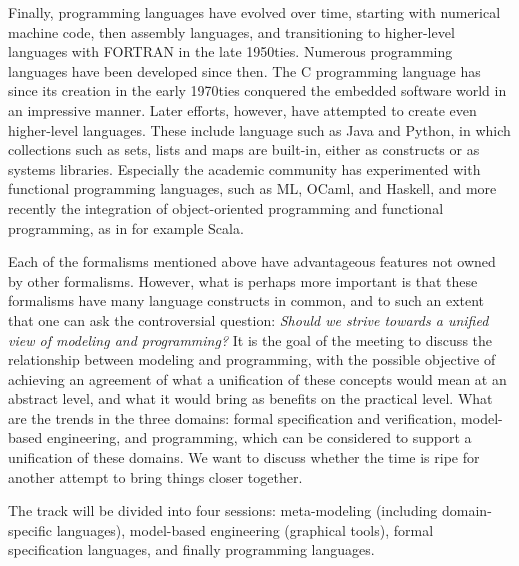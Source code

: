 Finally, programming languages have evolved over time, starting 
with numerical machine code, then assembly languages, and 
transitioning to higher-level languages with FORTRAN in the late 
1950ties. Numerous programming languages have been developed since 
then. The C programming language has  since its creation in the 
early 1970ties conquered the embedded software world in an 
impressive manner. Later efforts, however, have attempted to
create even higher-level languages. These include language such as
Java and Python, in which collections such as sets, lists and maps 
are built-in, either as constructs or as systems libraries. 
Especially the academic community has experimented with functional 
programming languages, such as ML, OCaml, and Haskell, and more 
recently the integration of object-oriented programming and 
functional programming, as in for example Scala.

Each of the formalisms mentioned above have advantageous features not owned by other formalisms. However, what is perhaps more important is that these formalisms have many language constructs in common, and to  such an extent that one can ask the controversial question: 
{\em Should we strive towards a unified view of modeling and 
programming?} 
It is the goal of the meeting to discuss the 
relationship between modeling and programming, with the possible 
objective of achieving an agreement of what a unification of these 
concepts would mean at an abstract level, and what it would bring 
as benefits on the practical level. What are the trends in the 
three domains: formal specification and verification,
model-based engineering, and
programming, which can be considered 
to support a unification of these domains. We want to discuss whether the time 
is ripe for another attempt to bring things closer together. 

The track will be divided into four sessions: meta-modeling 
(including domain-specific languages), 
model-based engineering (graphical tools), formal specification 
languages, and finally programming languages.
